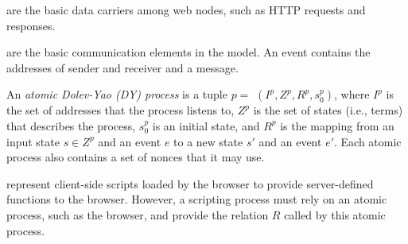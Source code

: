   are the basic data carriers among web nodes, such as HTTP requests and responses.
\begin{comment}
are defined as formal terms without variables (i.e., ground terms) over a {\em signature}. %
The signature $\Sigma$ consists of a finite set of function symbols (with arity). For messages in this mode, the signature $\Sigma$ contains constants such as ASCII strings and nonce, sequence symbols such as n-ary sequences $\langle \rangle$, $\langle . \rangle$, $\langle . ,. \rangle$, and function symbols that model cryptographic primitives such as $\mathtt{encrypt}, \mathtt{decrypt}$ and digital signatures. For example, an HTTP request can be modeled as a ground term containing a type (e.g., $\mathtt{HTTPReq}$), a nonce, a method (e.g., $\mathtt{GET}$ or $\mathtt{POST}$), a domain, a path, URL parameters, request headers and a message body, over the $\Sigma$ in the sequence symbol format. So,
an HTTP GET request for the domain {\sf exa.com/path?para=1} with empty header and body can be represented as: $m:=\langle\mathtt{HTTPReq},n,\mathtt{GET},exa.com,/path,\langle \langle para, 1\rangle \rangle ,\langle \rangle,\langle \rangle \rangle$.
\end{comment}

 are the basic communication elements in the model. An event contains the addresses of sender and receiver and a message.

 An {\em atomic Dolev-Yao (DY) process} is a tuple $p=$ $(I^p, Z^p, R^p,s_0^p )$, where $I^p$ is the set of addresses that the process listens to, $Z^p$ is the set of states (i.e., terms) that describes the process, $s_0^p$ is an initial state, and $R^p$ is the mapping from an input state $s \in Z^p$ and an event $e$ to a new state $s'$ and an event $e'$. %
Each atomic process also contains a set of nonces that it may use.

 represent client-side scripts loaded by the browser to provide server-defined functions to the browser. However, a scripting process must rely on an atomic process, such as the browser, and provide the relation $R$ called by this atomic process.

